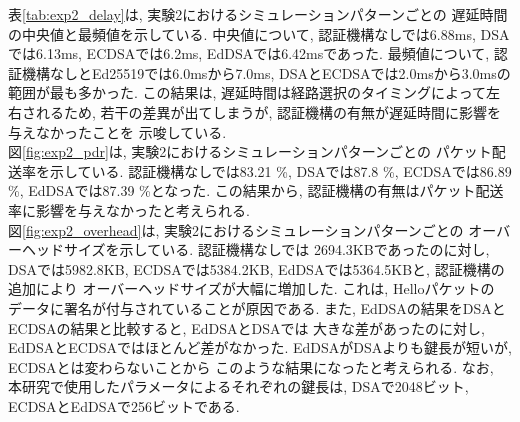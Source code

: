 \indent 表\ref{tab:exp2_delay}は, 実験2におけるシミュレーションパターンごとの
遅延時間の中央値と最頻値を示している. 中央値について, 認証機構なしでは6.88ms, 
DSAでは6.13ms, ECDSAでは6.2ms, EdDSAでは6.42msであった. 
最頻値について, 認証機構なしとEd25519では6.0msから7.0ms, 
DSAとECDSAでは2.0msから3.0msの範囲が最も多かった. 
この結果は, 遅延時間は経路選択のタイミングによって左右されるため, 
若干の差異が出てしまうが, 認証機構の有無が遅延時間に影響を与えなかったことを
示唆している. \\
\indent 図\ref{fig:exp2_pdr}は, 実験2におけるシミュレーションパターンごとの
パケット配送率を示している. 認証機構なしでは83.21 \%, DSAでは87.8 \%, 
ECDSAでは86.89 \%, EdDSAでは87.39 \%となった. この結果から, 
認証機構の有無はパケット配送率に影響を与えなかったと考えられる. \\
\indent 図\ref{fig:exp2_overhead}は, 実験2におけるシミュレーションパターンごとの
オーバーヘッドサイズを示している. 認証機構なしでは
2694.3KBであったのに対し, DSAでは5982.8KB, ECDSAでは5384.2KB, 
EdDSAでは5364.5KBと, 認証機構の追加により
オーバーヘッドサイズが大幅に増加した. これは, Helloパケットの
データに署名が付与されていることが原因である. また, 
EdDSAの結果をDSAとECDSAの結果と比較すると, EdDSAとDSAでは
大きな差があったのに対し, EdDSAとECDSAではほとんど差がなかった. 
EdDSAがDSAよりも鍵長が短いが, ECDSAとは変わらないことから
このような結果になったと考えられる. 
なお, 本研究で使用したパラメータによるそれぞれの鍵長は, 
DSAで2048ビット, ECDSAとEdDSAで256ビットである. \\


